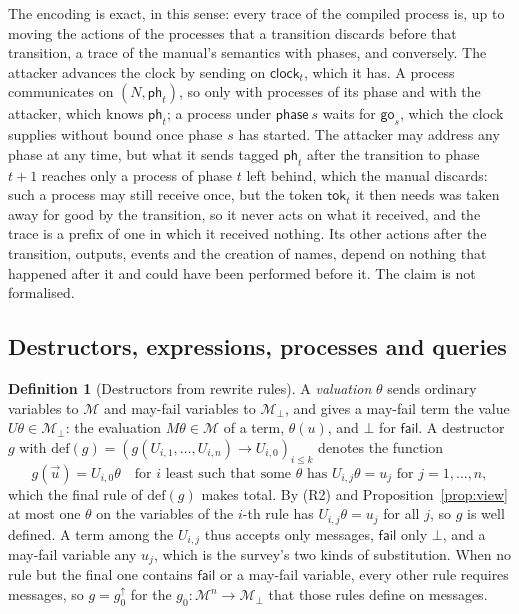 \documentclass[11pt]{article}
\theoremstyle{definition}
\newtheorem{definition}{Definition}[section]
\theoremstyle{plain}
\theoremstyle{remark}
\begin{document}
The encoding is exact, in this sense: every trace of the compiled process is, up to moving the actions of the processes that a transition discards before that transition, a trace of the manual's semantics with phases, and conversely. The attacker advances the clock by sending on $\mathsf{clock}_t$, which it has. A process communicates on $(N,\mathsf{ph}_t)$, so only with processes of its phase and with the attacker, which knows $\mathsf{ph}_t$; a process under $\mathsf{phase}\ s$ waits for $\mathsf{go}_s$, which the clock supplies without bound once phase $s$ has started. The attacker may address any phase at any time, but what it sends tagged $\mathsf{ph}_t$ after the transition to phase $t+1$ reaches only a process of phase $t$ left behind, which the manual discards: such a process may still receive once, but the token $\mathsf{tok}_t$ it then needs was taken away for good by the transition, so it never acts on what it received, and the trace is a prefix of one in which it received nothing. Its other actions after the transition, outputs, events and the creation of names, depend on nothing that happened after it and could have been performed before it. The claim is not formalised.

\subsection{Destructors, expressions, processes and queries}

\begin{definition}[Destructors from rewrite rules]\label{def:rules}
A \emph{valuation} $\theta$ sends ordinary variables to $\mathcal{M}$ and may-fail variables to $\mathcal{M}_{\bot}$, and gives a may-fail term the value $U\theta\in\mathcal{M}_{\bot}$: the evaluation $M\theta\in\mathcal{M}$ of a term, $\theta(u)$, and $\bot$ for $\mathsf{fail}$. A destructor $g$ with $\mathrm{def}(g)=(g(U_{i,1},\dots,U_{i,n})\to U_{i,0})_{i\le k}$ denotes the function
\[
g(\vec u)=U_{i,0}\theta\quad\text{for } i \text{ least such that some } \theta \text{ has } U_{i,j}\theta=u_j \text{ for } j=1,\dots,n,
\]
which the final rule of $\mathrm{def}(g)$ makes total. By (R2) and Proposition~\ref{prop:view} at most one $\theta$ on the variables of the $i$-th rule has $U_{i,j}\theta=u_j$ for all $j$, so $g$ is well defined. A term among the $U_{i,j}$ thus accepts only messages, $\mathsf{fail}$ only $\bot$, and a may-fail variable any $u_j$, which is the survey's two kinds of substitution. When no rule but the final one contains $\mathsf{fail}$ or a may-fail variable, every other rule requires messages, so $g=g_0^{\uparrow}$ for the $g_0:\mathcal{M}^n\to\mathcal{M}_{\bot}$ that those rules define on messages.
\end{definition}
\end{document}
